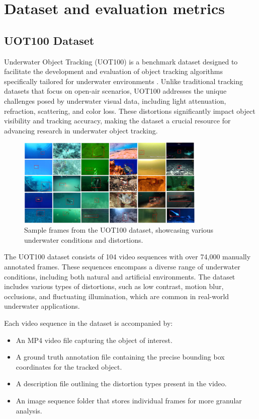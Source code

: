 \chapter{Dataset and evaluation metrics}
\label{chap:dataset}
\section{UOT100 Dataset}
Underwater Object Tracking (UOT100) is a benchmark dataset designed to facilitate the development and evaluation of object tracking algorithms specifically tailored for underwater environments \cite{kezebou2019underwater,panetta2021comprehensive}. Unlike traditional tracking datasets that focus on open-air scenarios, UOT100 addresses the unique challenges posed by underwater visual data, including light attenuation, refraction, scattering, and color loss. These distortions significantly impact object visibility and tracking accuracy, making the dataset a crucial resource for advancing research in underwater object tracking.

\begin{figure}
    \centering
    \includegraphics[width=0.8\textwidth]{images/uot100.png}
    \caption{Sample frames from the UOT100 dataset, showcasing various underwater conditions and distortions.}
    \label{fig:uot100_samples}
\end{figure}

The UOT100 dataset consists of 104 video sequences with over 74,000 manually annotated frames. These sequences encompass a diverse range of underwater conditions, including both natural and artificial environments. The dataset includes various types of distortions, such as low contrast, motion blur, occlusions, and fluctuating illumination, which are common in real-world underwater applications.

Each video sequence in the dataset is accompanied by:
\begin{itemize}
    \item An MP4 video file capturing the object of interest.
    \item A ground truth annotation file containing the precise bounding box coordinates for the tracked object.
    \item A description file outlining the distortion types present in the video.
    \item An image sequence folder that stores individual frames for more granular analysis.
\end{itemize}


